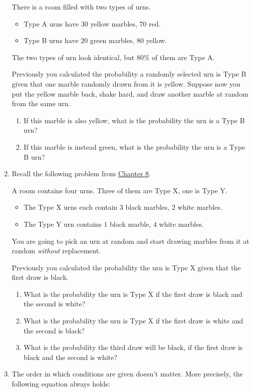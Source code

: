 \documentclass[justified]{tufte-book}
\providecommand{\tightlist}{%
  \setlength{\itemsep}{0pt}\setlength{\parskip}{0pt}}
\theoremstyle{definition}
\theoremstyle{definition}
\theoremstyle{definition}
\theoremstyle{remark}
\begin{document}
\begin{enumerate}
  There is a room filled with two types of urns.

  \begin{itemize}
  \tightlist
  \item
    Type A urns have \(30\) yellow marbles, \(70\) red.
  \item
    Type B urns have \(20\) green marbles, \(80\) yellow.
  \end{itemize}

  The two types of urn look identical, but \(80\%\) of them are Type A.

  Previously you calculated the probability a randomly selected urn is
  Type B given that one marble randomly drawn from it is yellow. Suppose
  now you put the yellow marble back, shake hard, and draw another
  marble at random from the same urn.

  \begin{enumerate}
  \def\labelenumii{\alph{enumii}.}
  \tightlist
  \item
    If this marble is also yellow, what is the probability the urn is a
    Type B urn?
  \item
    If this marble is instead green, what is the probability the urn is
    a Type B urn?
  \end{enumerate}
\item
  Recall the following problem from
  \protect\hyperlink{bayes-theorem}{Chapter 8}.

  A room contains four urns. Three of them are Type X, one is Type Y.

  \begin{itemize}
  \tightlist
  \item
    The Type X urns each contain \(3\) black marbles, \(2\) white
    marbles.
  \item
    The Type Y urn contains \(1\) black marble, \(4\) white marbles.
  \end{itemize}

  You are going to pick an urn at random and start drawing marbles from
  it at random \emph{without} replacement.

  Previously you calculated the probability the urn is Type X given that
  the first draw is black.

  \begin{enumerate}
  \def\labelenumii{\alph{enumii}.}
  \tightlist
  \item
    What is the probability the urn is Type X if the first draw is black
    and the second is white?
  \item
    What is the probability the urn is Type X if the first draw is white
    and the second is black?
  \item
    What is the probability the third draw will be black, if the first
    draw is black and the second is white?
  \end{enumerate}
\item
  The order in which conditions are given doesn't matter. More
  precisely, the following equation always holds:


\end{enumerate}
\end{document}

